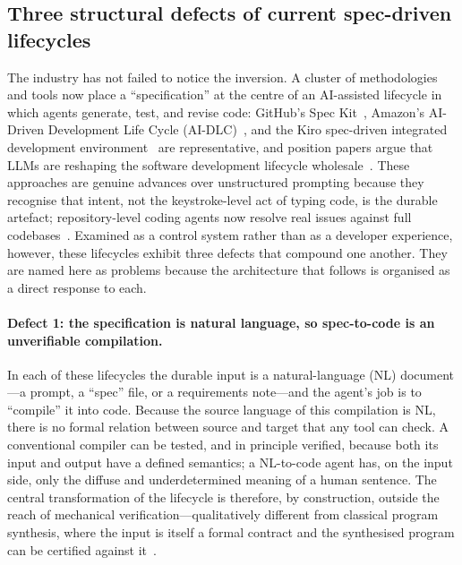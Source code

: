 \subsection{Three structural defects of current spec-driven lifecycles}\label{subsec:a5-defects}

The industry has not failed to notice the inversion. A cluster of methodologies and tools now place a ``specification'' at the centre of an AI-assisted lifecycle in which agents generate, test, and revise code: GitHub's Spec Kit~\cite{githubspeckit}, Amazon's AI-Driven Development Life Cycle (AI-DLC)~\cite{awsaidlc}, and the Kiro spec-driven integrated development environment~\cite{awskiro} are representative, and position papers argue that LLMs are reshaping the software development lifecycle wholesale~\cite{ozkaya2023llmse,liu2024llmagentse}. These approaches are genuine advances over unstructured prompting because they recognise that intent, not the keystroke-level act of typing code, is the durable artefact; repository-level coding agents now resolve real issues against full codebases~\cite{jimenez2024swebench,yang2024sweagent,zhang2024autocoderover}. Examined as a control system rather than as a developer experience, however, these lifecycles exhibit three defects that compound one another. They are named here as problems because the architecture that follows is organised as a direct response to each.

\paragraph{Defect 1: the specification is natural language, so spec-to-code is an unverifiable compilation.} In each of these lifecycles the durable input is a natural-language (NL) document---a prompt, a ``spec'' file, or a requirements note---and the agent's job is to ``compile'' it into code. Because the source language of this compilation is NL, there is no formal relation between source and target that any tool can check. A conventional compiler can be tested, and in principle verified, because both its input and output have a defined semantics; a NL-to-code agent has, on the input side, only the diffuse and underdetermined meaning of a human sentence. The central transformation of the lifecycle is therefore, by construction, outside the reach of mechanical verification---qualitatively different from classical program synthesis, where the input is itself a formal contract and the synthesised program can be certified against it~\cite{manna1980deductive,solarlezama2008sketching}.

